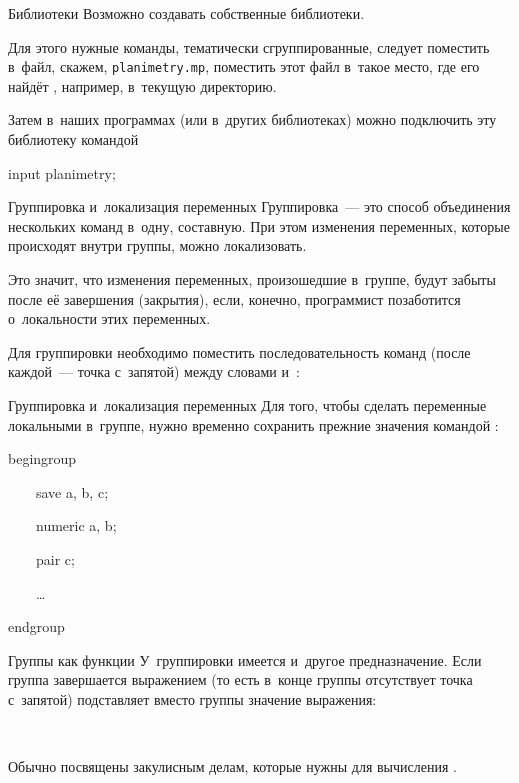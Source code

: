\begin{frame}{Библиотеки}
Возможно создавать собственные библиотеки.

Для этого нужные команды, тематически сгруппированные, следует поместить в~файл,
скажем, \nolinkurl{planimetry.mp}, поместить этот файл в~такое место, где
его найдёт , например, в~текущую директорию.

Затем в~наших программах (или в~других библиотеках) можно подключить эту
библиотеку командой
\begin{programlisting}
input planimetry;
\end{programlisting}
\end{frame}

\begin{frame}{Группировка и~локализация переменных}
Группировка~— это способ объединения нескольких команд в~одну, составную. При
этом изменения переменных, которые происходят внутри группы, можно
локализовать.

Это значит, что изменения переменных, произошедшие в~группе, будут забыты после
её завершения (закрытия), если, конечно, программист позаботится о~локальности
этих переменных.

Для группировки необходимо поместить последовательность команд (после каждой~—
точка с~запятой) между словами  и~:
\begin{center}
\LARGE
{}
\end{center}
\end{frame}

\begin{frame}{Группировка и~локализация переменных}
Для того, чтобы сделать переменные локальными в~группе, нужно временно
сохранить прежние значения командой :
\begin{programlisting}
begingroup\par
~~~~\alert{save a, b, c};\par
~~~~numeric a, b;\par
~~~~pair c;\par
~~~~…\par
endgroup
\end{programlisting}
\end{frame}

\begin{frame}{Группы как функции}
У~группировки имеется и~другое предназначение. Если группа завершается
выражением (то есть в~конце группы отсутствует точка с~запятой)
 подставляет вместо группы значение выражения:
\begin{center}
\LARGE
{}~
\end{center}

Обычно  посвящены закулисным делам, которые нужны для
вычисления .
\end{frame}

